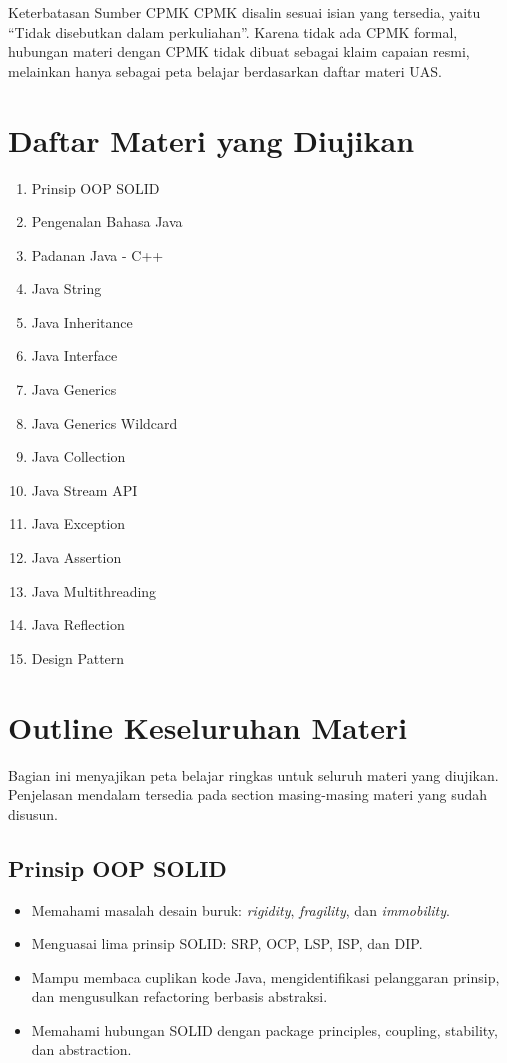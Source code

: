 \documentclass[11pt,a4paper]{article}
\begin{document}
\begin{cmt}{Keterbatasan Sumber CPMK}{}
CPMK disalin sesuai isian yang tersedia, yaitu ``Tidak disebutkan dalam perkuliahan''. Karena tidak ada CPMK formal, hubungan materi dengan CPMK tidak dibuat sebagai klaim capaian resmi, melainkan hanya sebagai peta belajar berdasarkan daftar materi UAS.
\end{cmt}

\section{Daftar Materi yang Diujikan}

\begin{enumerate}
    \item Prinsip OOP SOLID
    \item Pengenalan Bahasa Java
    \item Padanan Java - C++
    \item Java String
    \item Java Inheritance
    \item Java Interface
    \item Java Generics
    \item Java Generics Wildcard
    \item Java Collection
    \item Java Stream API
    \item Java Exception
    \item Java Assertion
    \item Java Multithreading
    \item Java Reflection
    \item Design Pattern
\end{enumerate}

\section{Outline Keseluruhan Materi}

Bagian ini menyajikan peta belajar ringkas untuk seluruh materi yang diujikan. Penjelasan mendalam tersedia pada section masing-masing materi yang sudah disusun.

\subsection{Prinsip OOP SOLID}
\begin{itemize}
    \item Memahami masalah desain buruk: \textit{rigidity}, \textit{fragility}, dan \textit{immobility}.
    \item Menguasai lima prinsip SOLID: SRP, OCP, LSP, ISP, dan DIP.
    \item Mampu membaca cuplikan kode Java, mengidentifikasi pelanggaran prinsip, dan mengusulkan refactoring berbasis abstraksi.
    \item Memahami hubungan SOLID dengan package principles, coupling, stability, dan abstraction.
\end{itemize}
\end{document}

